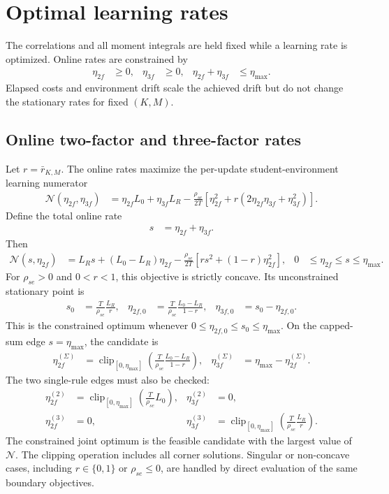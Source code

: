 \documentclass{article}
\begin{document}
\section{Optimal learning rates}

The correlations and all moment integrals are held fixed while a learning rate is optimized. Online rates are constrained by
\begin{align}
\eta_{2f} &\geq 0, & \eta_{3f} &\geq 0, & \eta_{2f}+\eta_{3f} &\leq \eta_{\max}.
\end{align}
Elapsed costs and environment drift scale the achieved drift but do not change the stationary rates for fixed $(K,M)$.

\subsection{Online two-factor and three-factor rates}

Let $r=\bar r_{K,M}$. The online rates maximize the per-update student-environment learning numerator
\begin{align}
\mathcal N(\eta_{2f},\eta_{3f}) &= \eta_{2f}L_0+\eta_{3f}L_R-\frac{\rho_{se}}{2T}\left[\eta_{2f}^2+r\left(2\eta_{2f}\eta_{3f}+\eta_{3f}^2\right)\right].
\end{align}
Define the total online rate
\begin{align}
s &= \eta_{2f}+\eta_{3f}.
\end{align}
Then
\begin{align}
\mathcal N(s,\eta_{2f}) &= L_Rs+(L_0-L_R)\eta_{2f}-\frac{\rho_{se}}{2T}\left[rs^2+(1-r)\eta_{2f}^2\right], & 0 &\leq \eta_{2f}\leq s\leq\eta_{\max}.
\end{align}
For $\rho_{se}>0$ and $0<r<1$, this objective is strictly concave. Its unconstrained stationary point is
\begin{align}
s_0 &= \frac{T}{\rho_{se}}\frac{L_R}{r}, & \eta_{2f,0} &= \frac{T}{\rho_{se}}\frac{L_0-L_R}{1-r}, & \eta_{3f,0} &= s_0-\eta_{2f,0}.
\end{align}
This is the constrained optimum whenever $0\leq\eta_{2f,0}\leq s_0\leq\eta_{\max}$. On the capped-sum edge $s=\eta_{\max}$, the candidate is
\begin{align}
\eta_{2f}^{(\Sigma)} &= \operatorname{clip}_{[0,\eta_{\max}]}\left(\frac{T}{\rho_{se}}\frac{L_0-L_R}{1-r}\right), & \eta_{3f}^{(\Sigma)} &= \eta_{\max}-\eta_{2f}^{(\Sigma)}.
\end{align}
The two single-rule edges must also be checked:
\begin{align}
\eta_{2f}^{(2)} &= \operatorname{clip}_{[0,\eta_{\max}]}\left(\frac{T}{\rho_{se}}L_0\right), & \eta_{3f}^{(2)} &= 0, \\
\eta_{2f}^{(3)} &= 0, & \eta_{3f}^{(3)} &= \operatorname{clip}_{[0,\eta_{\max}]}\left(\frac{T}{\rho_{se}}\frac{L_R}{r}\right).
\end{align}
The constrained joint optimum is the feasible candidate with the largest value of $\mathcal N$. The clipping operation includes all corner solutions. Singular or non-concave cases, including $r\in\{0,1\}$ or $\rho_{se}\leq0$, are handled by direct evaluation of the same boundary objectives.
\end{document}
